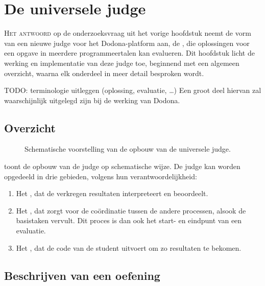 \chapter{De universele judge}\label{ch:de-universele-judge}

\lettrine{H}{et antwoord} op de onderzoeksvraag uit het vorige hoofdstuk neemt de vorm van een nieuwe judge voor het Dodona-platform aan, de , die oplossingen voor een opgave in meerdere programmeertalen kan evalueren.
Dit hoofdstuk licht de werking en implementatie van deze judge toe, beginnend met een algemeen overzicht, waarna elk onderdeel in meer detail besproken wordt.

TODO: terminologie uitleggen (oplossing, evaluatie, \ldots)
Een groot deel hiervan zal waarschijnlijk uitgelegd zijn bij de werking van Dodona.

\section{Overzicht}\label{sec:overzicht}

\begin{figure}
    \begin{adjustbox}{width=\textwidth}
        
    \end{adjustbox}
    \caption{Schematische voorstelling van de opbouw van de universele judge.}
    \label{fig:universal-judge}
\end{figure}

 toont de opbouw van de judge op schematische wijze.
De judge kan worden opgedeeld in drie gebieden, volgens hun verantwoordelijkheid:

\begin{enumerate}
    \item Het , dat de verkregen resultaten interpreteert en beoordeelt.
    \item Het , dat zorgt voor de coördinatie tussen de andere processen, alsook de basistaken vervult.
          Dit proces is dan ook het start- en eindpunt van een evaluatie.
    \item Het , dat de code van de student uitvoert om zo resultaten te bekomen.
\end{enumerate}

\section{Beschrijven van een oefening}\label{sec:beschrijven-van-een-oefening}

